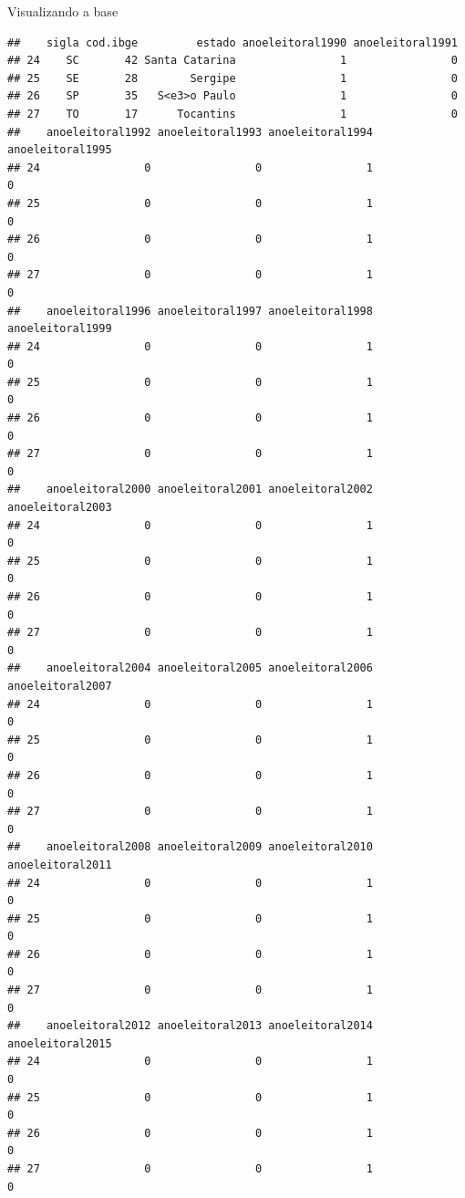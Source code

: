 \documentclass[
  10pt,
  ignorenonframetext,
]{beamer}
\begin{document}
\begin{frame}[fragile]{Visualizando a base}
\begin{verbatim}
##    sigla cod.ibge         estado anoeleitoral1990 anoeleitoral1991
## 24    SC       42 Santa Catarina                1                0
## 25    SE       28        Sergipe                1                0
## 26    SP       35   S<e3>o Paulo                1                0
## 27    TO       17      Tocantins                1                0
##    anoeleitoral1992 anoeleitoral1993 anoeleitoral1994 anoeleitoral1995
## 24                0                0                1                0
## 25                0                0                1                0
## 26                0                0                1                0
## 27                0                0                1                0
##    anoeleitoral1996 anoeleitoral1997 anoeleitoral1998 anoeleitoral1999
## 24                0                0                1                0
## 25                0                0                1                0
## 26                0                0                1                0
## 27                0                0                1                0
##    anoeleitoral2000 anoeleitoral2001 anoeleitoral2002 anoeleitoral2003
## 24                0                0                1                0
## 25                0                0                1                0
## 26                0                0                1                0
## 27                0                0                1                0
##    anoeleitoral2004 anoeleitoral2005 anoeleitoral2006 anoeleitoral2007
## 24                0                0                1                0
## 25                0                0                1                0
## 26                0                0                1                0
## 27                0                0                1                0
##    anoeleitoral2008 anoeleitoral2009 anoeleitoral2010 anoeleitoral2011
## 24                0                0                1                0
## 25                0                0                1                0
## 26                0                0                1                0
## 27                0                0                1                0
##    anoeleitoral2012 anoeleitoral2013 anoeleitoral2014 anoeleitoral2015
## 24                0                0                1                0
## 25                0                0                1                0
## 26                0                0                1                0
## 27                0                0                1                0

\end{verbatim}
\end{frame}
\end{document}
